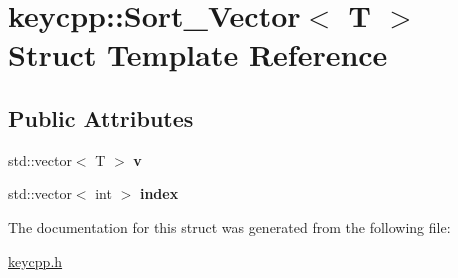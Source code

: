 \hypertarget{structkeycpp_1_1_sort___vector}{\section{keycpp\-:\-:Sort\-\_\-\-Vector$<$ T $>$ Struct Template Reference}
\label{structkeycpp_1_1_sort___vector}
}
\subsection*{Public Attributes}
\begin{DoxyCompactItemize}
\item 
\hypertarget{structkeycpp_1_1_sort___vector_aa43234b1dcb6f8f6e844e41047ea06c0}{std\-::vector$<$ T $>$ {\bfseries v}}\label{structkeycpp_1_1_sort___vector_aa43234b1dcb6f8f6e844e41047ea06c0}

\item 
\hypertarget{structkeycpp_1_1_sort___vector_ac8c282f95bba2e355688421526cc139c}{std\-::vector$<$ int $>$ {\bfseries index}}\label{structkeycpp_1_1_sort___vector_ac8c282f95bba2e355688421526cc139c}

\end{DoxyCompactItemize}


The documentation for this struct was generated from the following file\-:\begin{DoxyCompactItemize}
\item 
\hyperlink{keycpp_8h}{keycpp.\-h}\end{DoxyCompactItemize}
